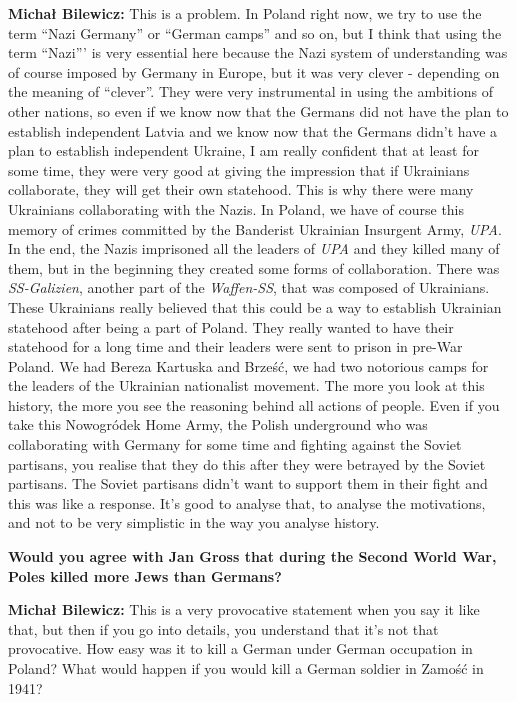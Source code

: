 \textbf{Michał Bilewicz:} This is a problem. In Poland right now, we try to use the term ``Nazi Germany'' or ``German camps'' and so on, but I think that using the term ``Nazi''' is very essential here because the Nazi system of understanding was of course imposed by Germany in Europe, but it was very clever - depending on the meaning of ``clever''. They were very instrumental in using the ambitions of other nations, so even if we know now that the Germans did not have the plan to establish independent Latvia and we know now that the Germans didn't have a plan to establish independent Ukraine, I am really confident that at least for some time, they were very good at giving the impression that if Ukrainians collaborate, they will get their own statehood. This is why there were many Ukrainians collaborating with the Nazis. In Poland, we have of course this memory of crimes committed by the Banderist Ukrainian Insurgent Army, \textit{UPA}. In the end, the Nazis imprisoned all the leaders of \textit{UPA} and they killed many of them, but in the beginning they created some forms of collaboration. There was \textit{SS-Galizien}, another part of the \textit{Waffen-SS}, that was composed of Ukrainians. These Ukrainians really believed that this could be a way to establish Ukrainian statehood after being a part of Poland. They really wanted to have their statehood for a long time and their leaders were sent to prison in pre-War Poland. We had Bereza Kartuska and Brześć, we had two notorious camps for the leaders of the Ukrainian nationalist movement. The more you look at this history, the more you see the reasoning behind all actions of people. Even if you take this Nowogródek Home Army, the Polish underground who was collaborating with Germany for some time and fighting against the Soviet partisans, you realise that they do this after they were betrayed by the Soviet partisans. The Soviet partisans didn't want to support them in their fight and this was like a response. It's good to analyse that, to analyse the motivations, and not to be very simplistic in the way you analyse history. 

\textbf{Would you agree with Jan Gross that during the Second World War, Poles killed more Jews than Germans?}

\textbf{Michał Bilewicz:} This is a very provocative statement when you say it like that, but then if you go into details, you understand that it's not that provocative. How easy was it to kill a German under German occupation in Poland? What would happen if you would kill a German soldier in Zamość in 1941?

